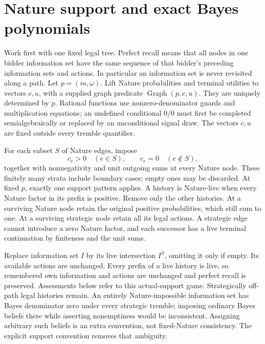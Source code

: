 \documentclass[11pt,a4paper]{article}
\numberwithin{equation}{section}
\theoremstyle{definition}
\DeclareMathOperator{\Graph}{Graph}
\begin{document}
\section{Nature support and exact Bayes polynomials}\label{sec:bayes}
Work first with one fixed legal tree.
Perfect recall means that all nodes in one bidder information set have
the same sequence of that bidder's preceding information sets and
actions. In particular an information set is never revisited along a path.
Let \(p=(m,\omega)\). Lift Nature probabilities and terminal utilities
to vectors \(c,u\), with a supplied graph predicate \(\Graph(p,c,u)\).
They are uniquely determined by \(p\).
Rational functions use nonzero-denominator guards and multiplication
equations; an undefined conditional \(0/0\) must first be completed
semialgebraically or replaced by an unconditional signal draw.
The vectors \(c,u\) are fixed outside every tremble quantifier.

For each subset \(S\) of Nature edges, impose
\[
 c_e>0\quad(e\in S),\qquad c_e=0\quad(e\notin S),
\]
together with nonnegativity and unit outgoing sums at every Nature node.
These finitely many strata include boundary cases; empty ones may be
discarded. At fixed \(p\), exactly one support pattern applies.
A history is Nature-live when every Nature factor in its prefix is
positive. Remove only the other histories.
At a surviving Nature node retain the original positive probabilities,
which still sum to one.
At a surviving strategic node retain all its legal actions.
A strategic edge cannot introduce a zero Nature factor, and each
successor has a live terminal continuation by finiteness and the unit sums.

Replace information set \(I\) by its live intersection \(I^S\), omitting
it only if empty. Its available actions are unchanged.
Every prefix of a live history is live, so remembered own information
and actions are unchanged and perfect recall is preserved.
Assessments below refer to this actual-support game.
Strategically off-path legal histories remain.
An entirely Nature-impossible information set has Bayes denominator
zero under every strategic tremble; imposing ordinary Bayes beliefs
there while asserting nonemptiness would be inconsistent.
Assigning arbitrary such beliefs is an extra convention, not fixed-Nature
consistency. The explicit support convention removes that ambiguity.
\end{document}
